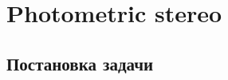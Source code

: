 \documentclass[12pt]{article}
\begin{document}


\newpage
\tableofcontents

\newpage



\newpage



\newpage



\newpage

\section{Photometric stereo}


\subsection{Постановка задачи}



\end{document}
